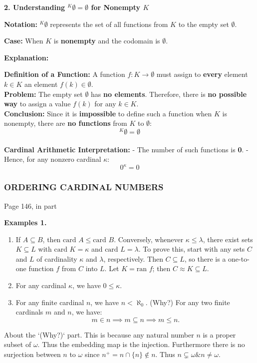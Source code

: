 \textbf{2. Understanding \({}^K \emptyset = \emptyset\) for Nonempty \(K\)}

\textbf{Notation:} \({}^K \emptyset\) represents the set of all functions from \(K\) to the empty set \(\emptyset\).

\textbf{Case:} When \(K\) is \textbf{nonempty} and the codomain is \(\emptyset\).

\textbf{Explanation:}

\textbf{Definition of a Function:} A function \(f: K \to \emptyset\) must assign to \textbf{every} element \(k \in K\) an element \(f(k) \in \emptyset\). \\
\textbf{Problem:} The empty set \(\emptyset\) has \textbf{no elements}. Therefore, there is \textbf{no possible way} to assign a value \(f(k)\) for any \(k \in K\). \\
\textbf{Conclusion:} Since it is \textbf{impossible} to define such a function when \(K\) is nonempty, there are \textbf{no functions} from \(K\) to \(\emptyset\):
  \[
  {}^K \emptyset = \emptyset
  \] \\ 
\textbf{Cardinal Arithmetic Interpretation:}
    - The number of such functions is \textbf{0}.
    - Hence, for any nonzero cardinal \(\kappa\):
      \[
      0^\kappa = 0
      \]
\subsubsection{ORDERING CARDINAL NUMBERS}
Page 146, in part
\begin{leftbar}
    \textbf{Examples 1.} 
    \begin{enumerate}
        \item If \(A \subseteq B\), then \(\text{card } A \leq \text{card } B\). Conversely, whenever \(\kappa \leq \lambda\), there exist sets \(K \subseteq L\) with \(\text{card } K = \kappa\) and \(\text{card } L = \lambda\). To prove this, start with any sets \(C\) and \(L\) of cardinality \(\kappa\) and \(\lambda\), respectively. Then \(C \subseteq L\), so there is a one-to-one function \(f\) from \(C\) into \(L\). Let \(K = \text{ran } f\); then \(C \approx K \subseteq L\).
        \item For any cardinal \(\kappa\), we have \(0 \leq \kappa\).
        \item For any finite cardinal \(n\), we have \(n < \aleph_0\). (Why?) For any two finite cardinals \(m\) and \(n\), we have:
        \[
        m \in n \implies m \subseteq n \implies m \leq n.
        \]
    \end{enumerate}
\end{leftbar}
About the `(Why?)` part. This is because any natural number \(n\) is a proper subset of \(\omega\). Thus the embedding map is the injection. Furthermore there is no surjection between \(n\) to \(\omega\) since \(n^+ = n \cap \{n\} \notin n\). Thus \(n \subsetneq \omega \& n \neq \omega\).
